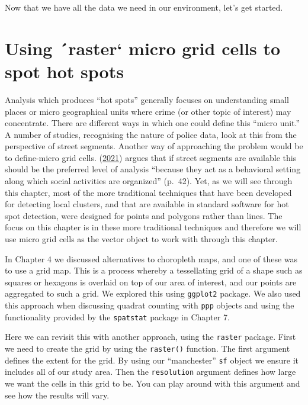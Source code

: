 \documentclass[
  krantz2]{krantz}
\begin{document}
Now that we have all the data we need in our environment, let's get started.

\hypertarget{using-raster-micro-grid-cells-to-spot-hot-spots}{%
\section{Using ´raster` micro grid cells to spot hot spots}\label{using-raster-micro-grid-cells-to-spot-hot-spots}}

Analysis which produces ``hot spots'' generally focuses on understanding small places or micro geographical units where crime (or other topic of interest) may concentrate. There are different ways in which one could define this ``micro unit.'' A number of studies, recognising the nature of police data, look at this from the perspective of street segments. Another way of approaching the problem would be to define-micro grid cells. (\protect\hyperlink{ref-Chainey_2021}{2021}) argues that if street segments are available this should be the preferred level of analysis ``because they act as a behavioral setting along which social activities are organized'' (p.~42). Yet, as we will see through this chapter, most of the more traditional techniques that have been developed for detecting local clusters, and that are available in standard software for hot spot detection, were designed for points and polygons rather than lines. The focus on this chapter is in these more traditional techniques and therefore we will use micro grid cells as the vector object to work with through this chapter.

In Chapter 4 we discussed alternatives to choropleth maps, and one of these was to use a grid map. This is a process whereby a tessellating grid of a shape such as squares or hexagons is overlaid on top of our area of interest, and our points are aggregated to such a grid. We explored this using \texttt{ggplot2} package. We also used this approach when discussing quadrat counting with \texttt{ppp} objects and using the functionality provided by the \texttt{spatstat} package in Chapter 7.

Here we can revisit this with another approach, using the \texttt{raster} package. First we need to create the grid by using the \texttt{raster()} function. The first argument defines the extent for the grid. By using our ``manchester'' \texttt{sf} object we ensure it includes all of our study area. Then the \texttt{resolution} argument defines how large we want the cells in this grid to be. You can play around with this argument and see how the results will vary.
\end{document}
